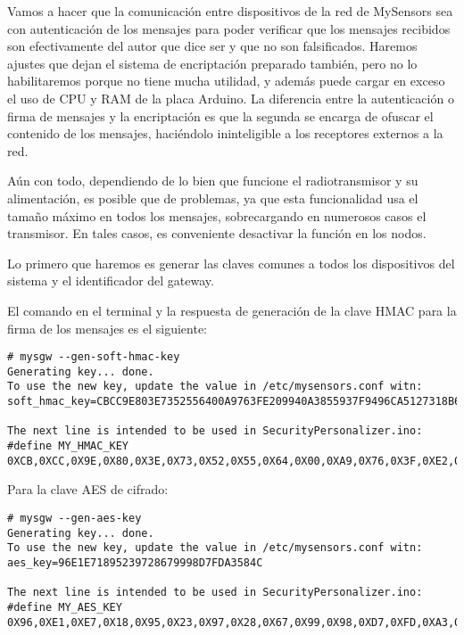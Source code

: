 Vamos a hacer que la comunicación entre dispositivos de la red de MySensors sea
con autenticación de los mensajes para poder verificar que los mensajes
recibidos son efectivamente del autor que dice ser y que no son falsificados.
Haremos ajustes que dejan el sistema de encriptación preparado también, pero no
lo habilitaremos porque no tiene mucha utilidad, y además puede cargar en
exceso el uso de CPU y RAM de la placa Arduino. La diferencia entre la
autenticación o firma de mensajes y la encriptación es que la segunda se
encarga de ofuscar el contenido de los mensajes, haciéndolo ininteligible a los
receptores externos a la red.

Aún con todo, dependiendo de lo bien que funcione el radiotransmisor y su
alimentación, es posible que de problemas, ya que esta funcionalidad usa el
tamaño máximo en todos los mensajes, sobrecargando en numerosos casos el
transmisor. En tales casos, es conveniente desactivar la función en los nodos.

Lo primero que haremos es generar las claves comunes a todos los dispositivos
del sistema y el identificador del gateway.

El comando en el terminal y la respuesta de generación de la clave HMAC para la
firma de los mensajes es el siguiente:

\begin{lstlisting}[breakatwhitespace=false]
# mysgw --gen-soft-hmac-key 
Generating key... done.
To use the new key, update the value in /etc/mysensors.conf witn:
soft_hmac_key=CBCC9E803E7352556400A9763FE209940A3855937F9496CA5127318B64332771

The next line is intended to be used in SecurityPersonalizer.ino:
#define MY_HMAC_KEY 0XCB,0XCC,0X9E,0X80,0X3E,0X73,0X52,0X55,0X64,0X00,0XA9,0X76,0X3F,0XE2,0X09,0X94,0X0A,0X38,0X55,0X93,0X7F,0X94,0X96,0XCA,0X51,0X27,0X31,0X8B,0X64,0X33,0X27,0X71
\end{lstlisting}

Para la clave AES de cifrado:

\begin{lstlisting}[breakatwhitespace=false]
# mysgw --gen-aes-key
Generating key... done.
To use the new key, update the value in /etc/mysensors.conf witn:
aes_key=96E1E71895239728679998D7FDA3584C

The next line is intended to be used in SecurityPersonalizer.ino:
#define MY_AES_KEY 0X96,0XE1,0XE7,0X18,0X95,0X23,0X97,0X28,0X67,0X99,0X98,0XD7,0XFD,0XA3,0X58,0X4C
\end{lstlisting}

